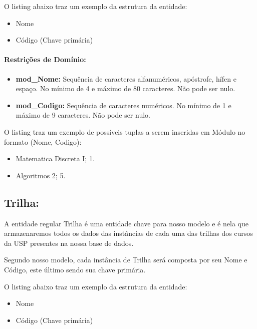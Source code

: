 \documentclass{report}
\begin{document}
  O listing abaixo traz um exemplo da estrutura da entidade:
\begin{itemize}
  \item Nome
  \item Código (Chave primária)
\end{itemize}
\paragraph{Restrições de Domínio:}
\begin{itemize}
  \item \textbf{mod\_Nome:} Sequência de caracteres alfanuméricos, apóstrofe, hífen e espaço. No mínimo de 4 e máximo de 80 caracteres. Não pode ser nulo.
  \item \textbf{mod\_Codigo:} Sequência de caracteres numéricos. No mínimo de 1 e máximo de 9 caracteres. Não pode ser nulo.
\end{itemize}
O listing traz um exemplo de possíveis tuplas a serem inseridas em Módulo no formato (Nome, Codigo):

\begin{itemize}
  \item Matematica Discreta I; 1. 
  \item Algoritmos 2; 5.
\end{itemize}
\subsection{Trilha:}
A entidade regular Trilha é uma entidade chave para nosso modelo e é nela que armazenaremos todos os dados das instâncias de cada uma das trilhas dos cursos da USP presentes na nossa base de dados.
  
  Segundo nosso modelo, cada instância de Trilha será composta por seu Nome e Código, este último sendo sua chave primária.
    
  O listing abaixo traz um exemplo da estrutura da entidade:
\begin{itemize}
  \item Nome
  \item Código (Chave primária)
\end{itemize}
\end{document}
